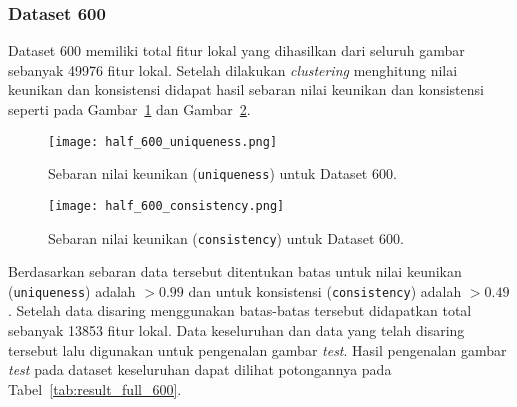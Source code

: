 \subsubsection{Dataset 600}
Dataset 600 memiliki total fitur lokal yang dihasilkan dari seluruh gambar sebanyak 49976 fitur lokal. Setelah dilakukan \textit{clustering} menghitung nilai keunikan dan konsistensi didapat hasil sebaran nilai keunikan dan konsistensi seperti pada Gambar~\ref{fig:half_600_uniqueness} dan Gambar~\ref{fig:half_600_consistency}.
\begin{figure}[H]
	\centering
	\texttt{[image: half\_600\_uniqueness.png]}
	\caption{Sebaran nilai keunikan (\texttt{uniqueness}) untuk Dataset 600.}
	\label{fig:half_600_uniqueness}
\end{figure}
\begin{figure}[H]
	\centering
	\texttt{[image: half\_600\_consistency.png]}
	\caption{Sebaran nilai keunikan (\texttt{consistency}) untuk Dataset 600.}
	\label{fig:half_600_consistency}
\end{figure}
Berdasarkan sebaran data tersebut ditentukan batas untuk nilai keunikan (\texttt{uniqueness}) adalah $> 0.99$ dan untuk konsistensi (\texttt{consistency}) adalah $> 0.49$. Setelah data disaring menggunakan batas-batas tersebut didapatkan total sebanyak 13853 fitur lokal. Data keseluruhan dan data yang telah disaring tersebut lalu digunakan untuk pengenalan gambar \textit{test}. 
Hasil pengenalan gambar \textit{test} pada dataset keseluruhan dapat dilihat potongannya pada Tabel~\ref{tab:result_full_600}.
